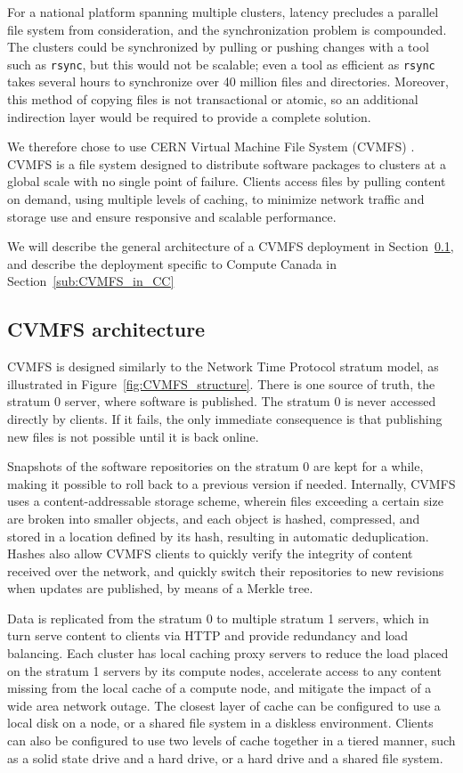 \documentclass[sigconf]{acmart}
\begin{document}
For a national platform spanning multiple clusters, latency precludes a parallel file system from consideration, and the synchronization problem is compounded. The clusters could be synchronized by pulling or pushing changes with a tool such as \texttt{rsync}, but this would not be scalable; even a tool as efficient as \texttt{rsync} takes several hours to synchronize over 40 million files and directories. Moreover, this method of copying files is not transactional or atomic, so an additional indirection layer would be required to provide a complete solution.

We therefore chose to use CERN Virtual Machine File System (CVMFS) \cite{CVMFS,CVMFS2012}. CVMFS is a file system designed to distribute software packages to clusters at a global scale with no single point of failure. Clients access files by pulling content on demand, using multiple levels of caching, to minimize network traffic and storage use and ensure responsive and scalable performance.

We will describe the general architecture of a CVMFS deployment in Section~\ref{sub:CVMFS_structure}, and describe the deployment specific to Compute Canada in Section~\ref{sub:CVMFS_in_CC}

\subsection{CVMFS architecture}
\label{sub:CVMFS_structure}
CVMFS is designed similarly to the Network Time Protocol stratum model, as illustrated in Figure~\ref{fig:CVMFS_structure}. There is one source of truth, the stratum 0 server, where software is published.  The stratum 0 is never accessed directly by clients. If it fails, the only immediate consequence is that publishing new files is not possible until it is back online. 

Snapshots of the software repositories on the stratum 0 are kept for a while, making it possible to roll back to a previous version if needed. Internally, CVMFS uses a content-addressable storage scheme, wherein files exceeding a certain size are broken into smaller objects, and each object is hashed, compressed, and stored in a location defined by its hash, resulting in automatic deduplication. Hashes also allow CVMFS clients to quickly verify the integrity of content received over the network, and quickly switch their repositories to new revisions when updates are published,  by means of a Merkle tree.

Data is replicated from the stratum 0 to multiple stratum 1 servers, which in turn serve content to clients via HTTP and provide redundancy and load balancing. Each cluster has local caching proxy servers to reduce the load placed on the stratum 1 servers by its compute nodes, accelerate access to any content missing from the local cache of a compute node, and mitigate the impact of a wide area network outage. The closest layer of cache can be configured to use a local disk on a node, or a shared file system in a diskless environment. Clients can also be configured to use two levels of cache together in a tiered manner, such as a solid state drive and a hard drive, or a hard drive and a shared file system.
\end{document}
